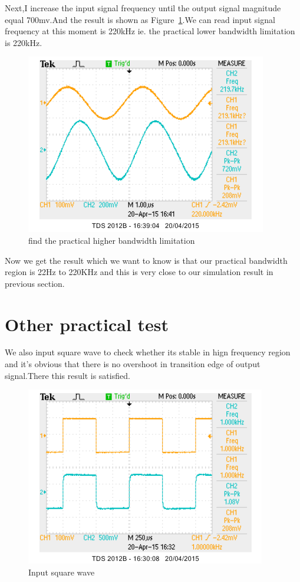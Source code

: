 Next,I increase the input signal frequency until the output signal magnitude equal 700mv.And the result is shown as Figure~\ref{fig:find the practical higher bandwidth limitation}.We can read input signal frequency at this moment is 220kHz ie. the practical lower bandwidth limitation is 220kHz.

\begin{figure}[htbp]
\centering
\includegraphics[scale=1]{"../Photo/Chap7/higher band practical"}
\caption{find the practical higher bandwidth limitation}
\label{fig:find the practical higher bandwidth limitation}
\end{figure}

Now we get the result which we want to know is that our practical bandwidth region is 22Hz to 220KHz and this is very close to our simulation result in previous section.

\section{Other practical test}

We also input square wave to check whether its stable in hign frequency region and it's obvious that there is no overshoot in transition edge of output signal.There this result is satisfied.
\begin{figure}[htbp]
\centering
\includegraphics[scale=1]{"../Photo/Chap7/1ksquare"}
\caption{Input square wave}
\label{fig:Input sqaure wave}
\end{figure}

